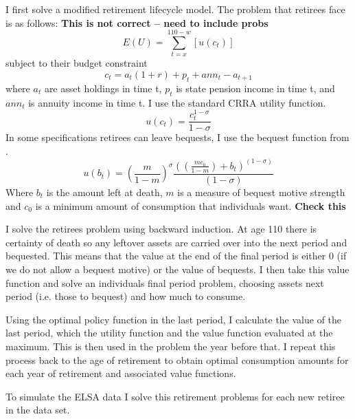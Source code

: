 \documentclass[12pt]{article}
\begin{document}
I first solve a modified retirement lifecycle model. The problem that retirees face is as follows:
\textbf{This is not correct -- need to include probs}
\begin{equation*}
      E(U) = \sum_{t = x}^{110 - w}[u(c_{t})]
\end{equation*}
subject to their budget constraint
\begin{equation*}
      c_{t} =a_{t}(1 +r) + p_{t} + ann_{t} -  a_{t+1}
\end{equation*}
where $a_{t}$ are asset holdings in time t, $p_{t}$ is state pension income in time t, and $ann_{t}$ is annuity
income in time t. I use the standard CRRA utility function.
\begin{equation*}
      u(c_{t}) = \frac{c_{t}^{1 - \sigma}}{1 - \sigma}
\end{equation*} In some specifications retirees can leave bequests, I use the bequest function from
\cite{lockwood_red_2012}.
\begin{equation*}
      u(b_{t}) = (\frac{m}{1 - m})^{\sigma}  \frac{((\frac{m c_{0}}{1 - m}) + b_{t})^(1 - \sigma)}{(1 - \sigma)}
\end{equation*}
Where $b_{t}$ is the amount left at death, $m$ is a measure of bequest motive strength and $c_{0}$ is
a minimum amount of consumption that individuals want. \textbf{Check this}

I solve the retirees problem using backward induction. At age 110 there is certainty of death so any leftover assets
are carried over into the next period and bequested. This means that the value at the end of the final period is
either 0 (if we do not allow a bequest motive) or the value of bequests. I then take this value function and solve
an individuals final period problem, choosing assets next period (i.e. those to bequest) and how much to consume.

Using the optimal policy function in the last period, I calculate the value of the last period, which the utility
function and the value function evaluated at the maximum. This is then used in the problem the year before that.
I repeat this process back to the age of retirement to obtain optimal consumption amounts for each year of retirement
and associated value functions.

To simulate the ELSA data I solve this retirement problems for each new retiree in the data set.
\end{document}
